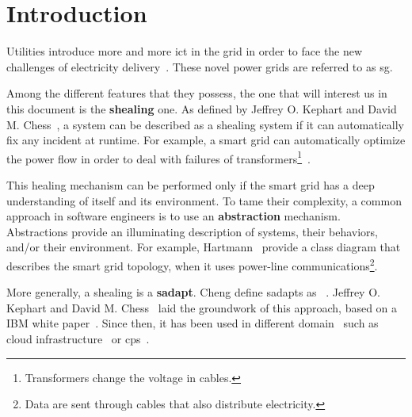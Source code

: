 \section{Introduction}

Utilities introduce more and more \gls{ict} in the grid in order to face the new challenges of electricity delivery~\cite{farhangi2010path, ipakchi2009grid, DBLP:journals/comsur/FangMXY12}.
These novel power grids are referred to as \gls{sg}.

Among the different features that they possess, the one that will interest us in this document is the \textbf{\gls{shealing}} one.
As defined by Jeffrey O. Kephart and David M. Chess~\cite{DBLP:journals/computer/KephartC03}, a system can be described as a \gls{shealing} system if it can automatically fix any incident at runtime.
For example, a smart grid can automatically optimize the power flow in order to deal with failures of transformers\footnote{Transformers change the voltage in cables.}~\cite{DBLP:journals/comsur/FangMXY12}.

This healing mechanism can be performed only if the smart grid has a deep understanding of itself and its environment.
To tame their complexity, a common approach in software engineers is to use an \textbf{abstraction} mechanism.
Abstractions provide an illuminating description of systems, their behaviors, and/or their environment.
For example, Hartmann~\etal \cite{DBLP:conf/smartgridcomm/0001FKTPTR14} provide a class diagram that describes the smart grid topology, when it uses power-line communications\footnote{Data are sent through cables that also distribute electricity.}.

\bigskip

More generally, a \gls{shealing} is a \textbf{\gls{sadapt}}. 
Cheng \etal define \glspl{sadapt} as ~\cite{DBLP:conf/dagstuhl/ChengLGIMABBBCSDFGGGKKKLMMMPSTTWW09}.
Jeffrey O. Kephart and David M. Chess~\cite{DBLP:journals/computer/KephartC03} laid the groundwork of this approach, based on a IBM white paper~\cite{computing2006architectural}.
Since then, it has been used in different domain~\cite{DBLP:journals/corr/abs-1904-01518} such as cloud infrastructure~\cite{DBLP:conf/icac/JavadiG17, OpenStack:Watcher:Wiki, DBLP:conf/icse/BarnaKFL17} or \gls{cps}~\cite{DBLP:conf/icac/LalandaGC17, DBLP:conf/cbse/FouquetMFBPJ12, DBLP:conf/smartgridsec/0001FKNT14}.


